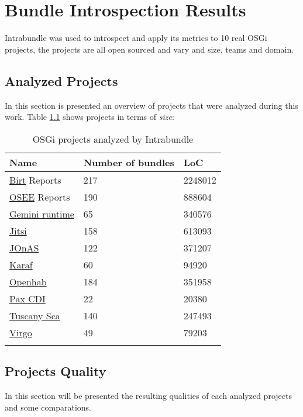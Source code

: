 \chapter{Bundle Introspection Results}

Intrabundle was used to introspect and apply its metrics to 10 real OSGi projects, the projects are all open sourced and vary and size, teams and domain. 

\section{Analyzed Projects}
In this section is presented an overview of projects that were analyzed during this work. Table \ref{osgi-analyzed-projects} shows projects in terms of \emph{size}:

\begin{table}[h]
\caption{OSGi projects analyzed by Intrabundle}
\label{osgi-analyzed-projects}
\begin{center}
    \begin{tabular}{  p{5cm} | p{5cm} | p{4cm}}
    \Xhline{2\arrayrulewidth}
    Name & Number of bundles & LoC \\  \hline
    \href{http://eclipse.org/birt/}{Birt} Reports & 217 & 2248012\\ \hline
    \href{https://eclipse.org/osee/}{OSEE} Reports & 190 & 888604\\ \hline
    \href{https://eclipse.org/gemini/}{Gemini runtime} & 65 & 340576\\ \hline
    \href{https://jitsi.org/}{Jitsi} & 158 & 613093\\ \hline
    \href{http://jonas.ow2.org/xwiki/bin/view/Main/}{JOnAS} & 122 & 371207\\ \hline
    \href{http://karaf.apache.org/}{Karaf} & 60 & 94920\\ \hline
    \href{http://www.openhab.org/}{Openhab} & 184 & 351958\\ \hline
    \href{http://team.ops4j.org/wiki/display/paxcdi/}{Pax CDI} & 22 & 20380\\ \hline 
    \href{http://tuscany.apache.org/sca-overview.html}{Tuscany Sca} & 140 & 247493\\ \hline
    \href{www.eclipse.org/virgo/}{Virgo} & 49 & 79203\\ 


   \Xhline{2\arrayrulewidth}

    \end{tabular}
\end{center}
\end{table}
\FloatBarrier 



\section{Projects Quality}
In this section will be presented the resulting qualities of each analyzed projects and some comparations.

